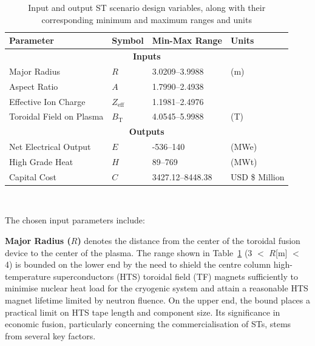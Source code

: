 \documentclass[journal]{IEEEtran}
\begin{document}
\begin{table}[]
    \begin{tabular}{@{}llll@{}}
    \toprule
    \textbf{Parameter}       & \textbf{Symbol} & \textbf{Min-Max Range} & \textbf{Units} \\ \midrule
    \multicolumn{4}{c}{\textbf{Inputs}}                                                    \\ \midrule
    Major Radius             & $R$               & 3.0209--3.9988          & (m)            \\
    Aspect Ratio             & $A$               & 1.7990--2.4938          &                \\
    Effective Ion Charge     & $Z_{\text{eff}}$  & 1.1981--2.4976          &                \\
    Toroidal Field on Plasma & $B_{\text{T}}$    & 4.0545--5.9988          & (T)            \\ \midrule
    \multicolumn{4}{c}{\textbf{Outputs}}                                                   \\ \midrule
    Net Electrical Output    & $E$               & -536--140               & (MWe)          \\
    High Grade Heat    & $H$               & 89--769                 & (MWt)           \\
    Capital Cost             & $C$               & 3427.12--8448.38        & USD \$ Million \\ \bottomrule
    \end{tabular}
    \caption{Input and output ST scenario design variables, along with their corresponding minimum and maximum ranges and units}~\label{tab:params}
    \end{table}

The chosen input parameters include: 

\textbf{Major Radius ($R$)} denotes the distance from the center of the toroidal fusion device to the center of the plasma. The range shown in Table~\ref{tab:params} (3 $<$ $R$[m] $<$ 4) is bounded on the lower end by the need to shield the centre column high-temperature superconductors (HTS) toroidal field (TF) magnets sufficiently to minimise nuclear heat load for the cryogenic system and attain a reasonable HTS magnet lifetime limited by neutron fluence. On the upper end, the bound places a practical limit on HTS tape length and component size. Its significance in economic fusion, particularly concerning the commercialisation of STs, stems from several key factors.
\end{document}
